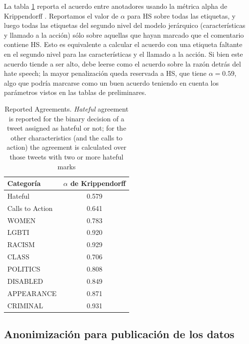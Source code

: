 La tabla \ref{tab:annotation_agreement} reporta el acuerdo entre anotadores usando la métrica alpha de Krippendorff . Reportamos el valor de $\alpha$ para HS sobre todas las etiquetas, y luego todas las etiquetas del segundo nivel del modelo jerárquico (características y llamado a la acción) sólo sobre aquellas que hayan marcado que el comentario contiene HS. Esto es equivalente a calcular el acuerdo con una etiqueta faltante en el segundo nivel para las características y el llamado a la acción. Si bien este acuerdo tiende a ser alto, debe leerse como el acuerdo sobre la razón detrás del hate speech; la mayor penalización queda reservada a HS, que tiene $\alpha = 0.59$, algo que podría marcarse como un buen acuerdo teniendo en cuenta los parámetros vistos en las tablas de preliminares. 

\begin{table}
    \centering
    \begin{tabular}{lc}
        \toprule
        Categoría   & $\alpha$ de Krippendorff \\
        \midrule
        Hateful              &  0.579 \\
        Calls to Action      &  0.641 \\
        \midrule
        WOMEN                &  0.783 \\
        LGBTI                &  0.920 \\
        RACISM               &  0.929 \\
        CLASS                &  0.706 \\
        POLITICS             &  0.808 \\
        DISABLED             &  0.849 \\
        APPEARANCE           &  0.871 \\
        CRIMINAL             &  0.931 \\
        \bottomrule
    \end{tabular}
    \caption{Reported Agreements. \emph{Hateful} agreement is reported for the binary decision of a tweet assigned as hateful or not; for the other characteristics (and the calls to action) the agreement is calculated over those tweets with two or more hateful marks}
    \label{tab:annotation_agreement}
\end{table}








\subsection{Anonimización para publicación de los datos}



